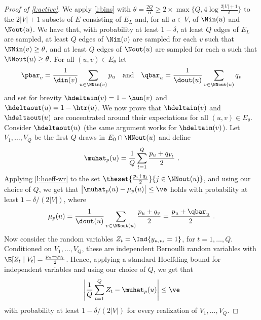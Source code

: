 \begin{proof}[Proof of \autoref{l:active}]
We apply \autoref{l:bins} with $\theta = \tfrac{2Q}{\alpha} \ge 2\times\max\big\{Q,4\log
\frac{2|V|+1}{\delta}\big\}$ to the $2|V|+1$ subsets of $E$ consisting of $E_L$ and, for all $u \in
V$, of $\Nin(u)$ and $\Nout(u)$. We have that, with probability at least $1-\delta$, at least $Q$
edges of $E_L$ are sampled, at least $Q$ edges of $\Nin(v)$ are sampled for each $v$ such that
$\NNin(v) \ge \theta$, and at least $Q$ edges of $\Nout(u)$ are sampled for each $u$ such that
$\NNout(u) \ge \theta$.
For all $(u,v) \in E_{\theta}$ let
\[
  \pbar_v = \frac{1}{\din(v)}\sum_{u\in\NNin(v)} p_u \quad\text{and}\quad
  \qbar_u = \frac{1}{\dout(u)}\sum_{v\in\NNout(u)} q_v
\]
and set for brevity $\hdeltain(v) = 1-\hun(v)$ and $\hdeltaout(u) = 1-\htr(u)$.
We now prove that $\hdeltain(v)$ and $\hdeltaout(u)$ are concentrated around their expectations for
all $(u,v) \in E_{\theta}$. Consider $\hdeltaout(u)$ (the same argument works for $\hdeltain(v)$).
Let $V_1,\dots,V_Q$ be the first $Q$ draws in $E_0 \cap \NNout(u)$ and define
\[
  \muhat_p(u) = \frac{1}{Q} \sum_{t=1}^Q \frac{p_u+q_{V_t}}{2}~.
\]
Applying \autoref{l:hoeff-wr} to the set $\theset{\tfrac{p_i+q_j}{2}}{j \in \NNout(u)}$, and using
our choice of $Q$, we get that $\big|\muhat_p(u) - \mu_p(u)\big| \le \ve$ holds with probability at
least $1-\delta/(2|V|)$, where
\[
  \mu_p(u) = \frac{1}{\dout(u)}\sum_{v \in \NNout(u)} \frac{p_u + q_v}{2} = \frac{p_u + \qbar_u}{2}~.
\]
Now consider the random variables $Z_t = \Ind{y_{u,v_t}=1}$, for $t=1,\dots,Q$. Conditioned on
$V_1,\dots,V_Q$, these are independent Bernoulli random variables with $\E[Z_t \mid V_t] =
\tfrac{p_u+q_{V_t}}{2}$. Hence, applying a standard Hoeffding bound for independent variables and
using our choice of $Q$, we get that
\[
  \left|\frac{1}{Q}\sum_{t=1}^Q Z_t - \muhat_p(u) \right| \le \ve 
\]
with probability at least $1-\delta/(2|V|)$ for every realization of $V_1,\dots,V_Q$. 


\end{proof}
